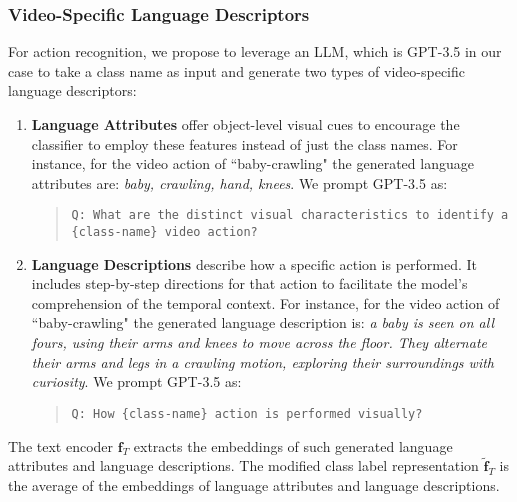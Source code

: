 \documentclass{article} \usepackage{iclr2024_conference,times}
\begin{document}
\subsubsection{Video-Specific Language Descriptors}
\label{subsubsec:Video-Specific Language Descriptors}
For action recognition, we propose to leverage an LLM, which is GPT-3.5 in our case \citep{brown2020language} to take a class name as input and generate two types of video-specific language descriptors: 
\begin{enumerate}
    \item  \textbf{Language Attributes} offer object-level visual cues to encourage the classifier to employ these features instead of just the class names. For instance, for the video action of ``baby-crawling" the generated language attributes are: \emph{baby, crawling, hand, knees}. We prompt GPT-3.5 as:
     \begin{quotation}
\centering \begin{minipage}{0.9\linewidth} {\texttt{Q: What are the distinct visual characteristics to identify a {\{class-name}\} video action?}} 
    \newline
    
\end{minipage}
\end{quotation}
   
    \item  \textbf{Language Descriptions} describe how a specific action is performed. It includes step-by-step directions for that action to facilitate the model's comprehension of the temporal context. For instance, for the video action of ``baby-crawling" the generated language description is: \emph{a baby is seen on all fours, using their arms and knees to move across the floor. They alternate their arms and legs in a crawling motion, exploring their surroundings with curiosity}. We prompt GPT-3.5 as:
     \begin{quotation}
\centering \begin{minipage}{0.9\linewidth} {\texttt{Q: How {\{class-name}\} action is performed visually? }} 
\end{minipage}
\end{quotation}
    
\end{enumerate}

The text encoder $\bm{f}_{T}$ extracts the embeddings of such generated language attributes and language descriptions. The modified class label representation  $\bm{\tilde{f}}_T$ is the average of the embeddings of language attributes and language descriptions.
\end{document}
